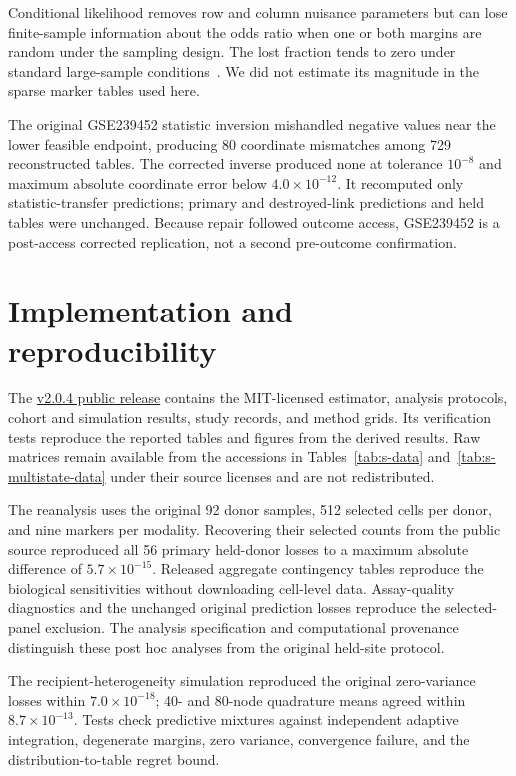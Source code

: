 \documentclass[10pt,a4paper]{article}
\begin{document}
Conditional likelihood removes row and column nuisance parameters but can lose finite-sample information about the odds ratio when one or both margins are random under the sampling design. The lost fraction tends to zero under standard large-sample conditions~\cite{schervish2025}. We did not estimate its magnitude in the sparse marker tables used here.

The original GSE239452 statistic inversion mishandled negative values near the lower feasible endpoint, producing 80 coordinate mismatches among 729 reconstructed tables. The corrected inverse produced none at tolerance $10^{-8}$ and maximum absolute coordinate error below $4.0\times10^{-12}$. It recomputed only statistic-transfer predictions; primary and destroyed-link predictions and held tables were unchanged. Because repair followed outcome access, GSE239452 is a post-access corrected replication, not a second pre-outcome confirmation.

\section{Implementation and reproducibility}
\label{sec:provenance}

The \href{https://github.com/sushaan-k/coupling-fields-benchmark/releases/tag/coupling-fields-v2.0.4-public-benchmark}{v2.0.4 public release} contains the MIT-licensed estimator, analysis protocols, cohort and simulation results, study records, and method grids. Its verification tests reproduce the reported tables and figures from the derived results. Raw matrices remain available from the accessions in Tables~\ref{tab:s-data} and~\ref{tab:s-multistate-data} under their source licenses and are not redistributed.

The reanalysis uses the original 92 donor samples, 512 selected cells per donor, and nine markers per modality. Recovering their selected counts from the public source reproduced all 56 primary held-donor losses to a maximum absolute difference of $5.7\times10^{-15}$. Released aggregate contingency tables reproduce the biological sensitivities without downloading cell-level data. Assay-quality diagnostics and the unchanged original prediction losses reproduce the selected-panel exclusion. The analysis specification and computational provenance distinguish these post hoc analyses from the original held-site protocol.

The recipient-heterogeneity simulation reproduced the original zero-variance losses within $7.0\times10^{-18}$; 40- and 80-node quadrature means agreed within $8.7\times10^{-13}$. Tests check predictive mixtures against independent adaptive integration, degenerate margins, zero variance, convergence failure, and the distribution-to-table regret bound.
\end{document}
